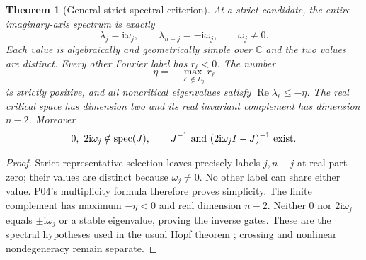 \documentclass[11pt]{article}
\newcommand{\C}{\mathbb{C}}
\newcommand{\ii}{\mathrm{i}}
\DeclareMathOperator{\spec}{spec}
\DeclareMathOperator{\Ree}{Re}
\newtheorem{theorem}{Theorem}[section]
\theoremstyle{definition}
\theoremstyle{remark}
\begin{document}
\begin{theorem}[General strict spectral criterion]
\label{thm:P11-strict}
At a strict candidate, the entire imaginary-axis spectrum is exactly
\begin{equation}
 \lambda_j=\ii\omega_j,\qquad
 \lambda_{n-j}=-\ii\omega_j,\qquad \omega_j\ne0.
 \label{eq:P11-critical-pair}
\end{equation}
Each value is algebraically and geometrically simple over $\C$ and the
two values are distinct. Every other Fourier label has $r_\ell<0$.
The number
\begin{equation}
 \eta=-\max_{\ell\notin L_j}r_\ell
 \label{eq:P11-gap}
\end{equation}
is strictly positive, and all noncritical eigenvalues satisfy
$\Ree\lambda_\ell\le-\eta$. The real critical space has dimension
two and its real invariant complement has dimension $n-2$.
Moreover
\begin{equation}
 0,\ 2\ii\omega_j\notin\spec(J),\qquad
 J^{-1}\ \hbox{and}\ (2\ii\omega_j I-J)^{-1}\ \hbox{exist}.
 \label{eq:P11-resolvent-gates}
\end{equation}
\end{theorem}
\begin{proof}
Strict representative selection leaves precisely labels $j,n-j$ at
real part zero; their values are distinct because $\omega_j\ne0$.
No other label can share either value. P04's multiplicity formula
therefore proves simplicity. The finite complement has maximum
$-\eta<0$ and real dimension $n-2$. Neither $0$ nor $2\ii\omega_j$
equals $\pm\ii\omega_j$ or a stable eigenvalue, proving the inverse gates.
These are the spectral hypotheses used in the usual Hopf theorem
\cite{KuznetsovHopf2006}; crossing and nonlinear nondegeneracy remain separate.
\end{proof}
\end{document}
